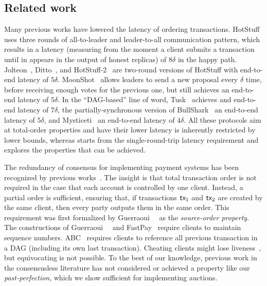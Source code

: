 \subsection{Related work}\label{app:related}

Many previous works have lowered the latency of ordering transactions.
HotStuff~\cite{DBLP:conf/podc/YinMRGA19} uses three rounds of all-to-leader and leader-to-all communication pattern, which results in a latency (measuring from the moment a client submits a transaction until in appears in the output of honest replicas) of $8\delta$ in the happy path.
Jolteon~\cite{DBLP:conf/fc/GelashviliKSSX22}, Ditto~\cite{DBLP:conf/fc/GelashviliKSSX22}, and HotStuff-2~\cite{DBLP:journals/iacr/MalkhiN23} are two-round versions of HotStuff with end-to-end latency of $5\delta$.
MoonShot~\cite{DBLP:journals/corr/abs-2401-01791} allows leaders to send a new proposal every $\delta$ time, before receiving enough votes for the previous one, but still achieves an end-to-end latency of $5\delta$.
In the ``DAG-based'' line of word, Tusk~\cite{DBLP:conf/eurosys/DanezisKSS22} achieves and end-to-end latency of $7\delta$,
the partially-synchronous version of BullShark~\cite{DBLP:journals/corr/abs-2209-05633} an end-to-end latency of $5\delta$,
and Mysticeti~\cite{DBLP:journals/corr/abs-2310-14821} an end-to-end latency of $4\delta$.
All these protocols aim at total-order properties and have their lower latency is inherently restricted by lower bounds, whereas \podtm starts from the single-round-trip latency requirement and explores the properties that can be achieved.

The redundancy of consensus for implementing payment systems has been recognized by previous works~\cite{DBLP:journals/dc/GuerraouiKMPS22,DBLP:journals/corr/abs-1909-10926,DBLP:conf/dsn/CollinsGKKMPPST20,DBLP:conf/aft/BaudetDS20}.
The insight is that total transaction order is not required in the case that each account is controlled by one client.
Instead, a partial order is sufficient, ensuring that, if transactions $\textsf{tx}_1$ and $\textsf{tx}_2$ are created by the same client, then every party outputs them in the same order.
This requirement was first formalized by Guerraoui~\etal~\cite{DBLP:journals/dc/GuerraouiKMPS22} as the \emph{source-order property}.
The constructions of Guerraoui~\etal~\cite{DBLP:journals/dc/GuerraouiKMPS22} and FastPay~\cite{DBLP:conf/aft/BaudetDS20} require clients to maintain sequence numbers.
ABC~\cite{DBLP:journals/corr/abs-1909-10926} requires clients to reference all previous transaction in a DAG (including its own last transaction).
Cheating clients might lose liveness~\cite{DBLP:conf/aft/BaudetDS20,DBLP:journals/dc/GuerraouiKMPS22,DBLP:journals/corr/abs-1909-10926}, but equivocating is not possible.
To the best of our knowledge, previous work in the consensusless literature has not considered or achieved a property like our \emph{past-perfection}, which we show sufficient for implementing auctions.